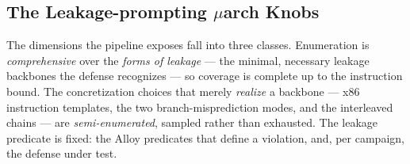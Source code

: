 \subsection{The Leakage-prompting $\mu$arch Knobs}
The dimensions the pipeline exposes fall into three classes. Enumeration is \emph{comprehensive} over the \emph{forms of leakage} --- the minimal, necessary leakage backbones the defense recognizes --- so coverage is complete up to the instruction bound. The concretization choices that merely \emph{realize} a backbone --- x86 instruction templates, the two branch-misprediction modes, and the interleaved chains --- are \emph{semi-enumerated}, sampled rather than exhausted. The leakage predicate is fixed: the Alloy predicates that define a violation, and, per campaign, the defense under test. 
\notebr
